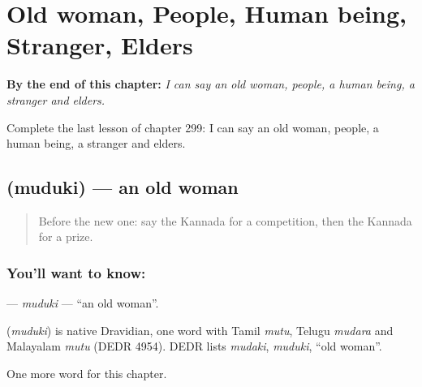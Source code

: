 
\chapter{Old woman, People, Human being, Stranger, Elders}
\label{ch:ka-old-woman-people-human-being-stranger-elders}

\begin{chapteropening}
\textbf{By the end of this chapter:} \emph{I can say an old woman, people, a human being, a stranger and elders.}

Complete the last lesson of chapter 299: I can say an old woman, people, a human being, a stranger and elders.
\end{chapteropening}

\section[\texorpdfstring{\kn{ಮುದುಕಿ} (muduki)}{ಮುದುಕಿ (muduki)}]{ (muduki) — an old woman}

\label{lesson:KA-C299-muduki}



\begin{quote}
Before the new one: say the Kannada for a competition, then the Kannada for a prize.
\end{quote}

\subsection*{You'll want to know: }
\textbf{} — \emph{muduki} — \textquotedblleft{}an old woman\textquotedblright{}.

\begin{cousinweb}
\textbf{} (\emph{muduki}) is native Dravidian, one word with Tamil \emph{mutu}, Telugu \emph{mudara} and Malayalam \emph{mutu} (DEDR 4954). DEDR lists \emph{mudaki}, \emph{muduki}, \textquotedblleft{}old woman\textquotedblright{}.
\end{cousinweb}

\begin{grammarlens}[title={What you've built}]
One more word for this chapter.
\end{grammarlens}

